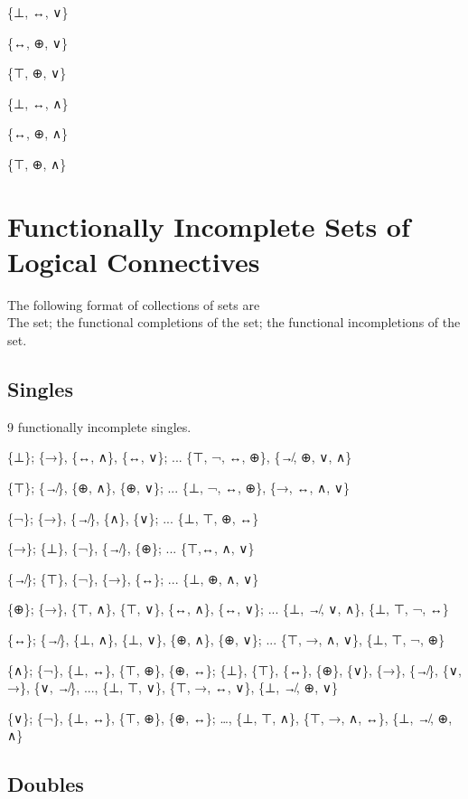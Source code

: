 \{⊥, ↔, ∨\}

\{↔, ⊕, ∨\}

\{⊤, ⊕, ∨\}

\{⊥, ↔, ∧\}

\{↔, ⊕, ∧\}

\{⊤, ⊕, ∧\}

\hypertarget{functionally-incomplete-sets-of-logical-connectives}{%
\section{Functionally Incomplete Sets of Logical
Connectives}\label{functionally-incomplete-sets-of-logical-connectives}}

The following format of collections of sets are\\
The set; the functional completions of the set; the functional
incompletions of the set.

\hypertarget{singles-1}{%
\subsection{Singles}\label{singles-1}}

9 functionally incomplete singles.

\{⊥\}; \{→\}, \{↔, ∧\}, \{↔, ∨\}; ... \{⊤, ¬, ↔, ⊕\}, \{↛, ⊕, ∨, ∧\}

\{⊤\}; \{↛\}, \{⊕, ∧\}, \{⊕, ∨\}; ... \{⊥, ¬, ↔, ⊕\}, \{→, ↔, ∧, ∨\}

\{¬\}; \{→\}, \{↛\}, \{∧\}, \{∨\}; ... \{⊥, ⊤, ⊕, ↔\}

\{→\}; \{⊥\}, \{¬\}, \{↛\}, \{⊕\}; ... \{⊤,↔, ∧, ∨\}

\{↛\}; \{⊤\}, \{¬\}, \{→\}, \{↔\}; ... \{⊥, ⊕, ∧, ∨\}

\{⊕\}; \{→\}, \{⊤, ∧\}, \{⊤, ∨\}, \{↔, ∧\}, \{↔, ∨\}; ... \{⊥, ↛, ∨,
∧\}, \{⊥, ⊤, ¬, ↔\}

\{↔\}; \{↛\}, \{⊥, ∧\}, \{⊥, ∨\}, \{⊕, ∧\}, \{⊕, ∨\}; ... \{⊤, →, ∧,
∨\}, \{⊥, ⊤, ¬, ⊕\}

\{∧\}; \{¬\}, \{⊥, ↔\}, \{⊤, ⊕\}, \{⊕, ↔\}; \{⊥\}, \{⊤\}, \{↔\}, \{⊕\},
\{∨\}, \{→\}, \{↛\}, \{∨, →\}, \{∨, ↛\}, ..., \{⊥, ⊤, ∨\}, \{⊤, →, ↔,
∨\}, \{⊥, ↛, ⊕, ∨\}

\{∨\}; \{¬\}, \{⊥, ↔\}, \{⊤, ⊕\}, \{⊕, ↔\}; \ldots, \{⊥, ⊤, ∧\}, \{⊤, →,
∧, ↔\}, \{⊥, ↛, ⊕, ∧\}

\hypertarget{doubles-1}{%
\subsection{Doubles}\label{doubles-1}}

